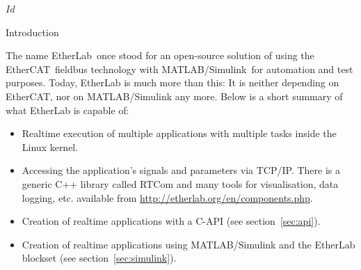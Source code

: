
\SVN $Id$
\rfoot{\SVNId}

\begin{ighsec}{Introduction}
\label{sec:intro}

The name EtherLab\regTM\ once stood for an open-source solution of using the
EtherCAT\regTM\ fieldbus technology with MATLAB/Simulink\regTM\ for automation
and test purposes. Today, EtherLab is much more than this: It is neither
depending on EtherCAT, nor on MATLAB/Simulink any more. Below is a short
summary of what EtherLab is capable of:

\begin{itemize}

\item Realtime execution of multiple applications with multiple tasks inside
the Linux kernel.

\item Accessing the application's signals and parameters via TCP/IP. There is
a generic C++ library called RTCom and many tools for visualisation, data
logging, etc. available from \url{http://etherlab.org/en/components.php}.

\item Creation of realtime applications with a C-API (see
section~\ref{sec:api}).

\item Creation of realtime applications using MATLAB/Simulink and the EtherLab
blockset (see section~\ref{sec:simulink}).

\end{itemize}

\end{ighsec}


